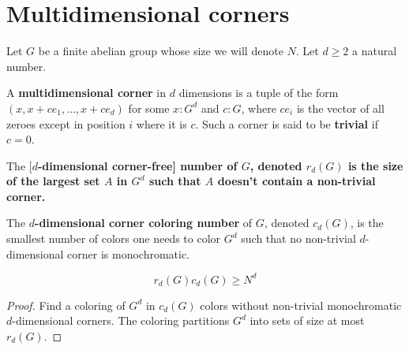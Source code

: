 \chapter{Multidimensional corners}

Let $G$ be a finite abelian group whose size we will denote $N$. Let $d \ge 2$ a natural number.

\begin{definition}
  \label{def:multicorner}

  A {\bf multidimensional corner} in $d$ dimensions is a tuple of the form $(x, x + ce_1, \dots, x + ce_d)$ for some $x : G^d$ and $c : G$, where $ce_i$ is the vector of all zeroes except in position $i$ where it is $c$. Such a corner is said to be {\bf trivial} if $c = 0$.
\end{definition}

\begin{definition}
  \label{def:corner-free-num}

  The [\bf $d$-dimensional corner-free] number of $G$, denoted $r_d(G)$ is the size of the largest set $A$ in $G^d$ such that $A$ doesn't contain a non-trivial corner.
\end{definition}

\begin{definition}
  \label{def:corner-color-num}

  The {\bf $d$-dimensional corner coloring number} of $G$, denoted $c_d(G)$, is the smallest number of colors one needs to color $G^d$ such that no non-trivial $d$-dimensional corner is monochromatic.
\end{definition}

\begin{lemma}
  \label{lem:corner-num-lower}

  $$r_d(G) c_d(G) \ge N^d$$
\end{lemma}
\begin{proof}

  Find a coloring of $G^d$ in $c_d(G)$ colors without non-trivial monochromatic $d$-dimensional corners. The coloring partitions $G^d$ into sets of size at most $r_d(G)$.
\end{proof}

